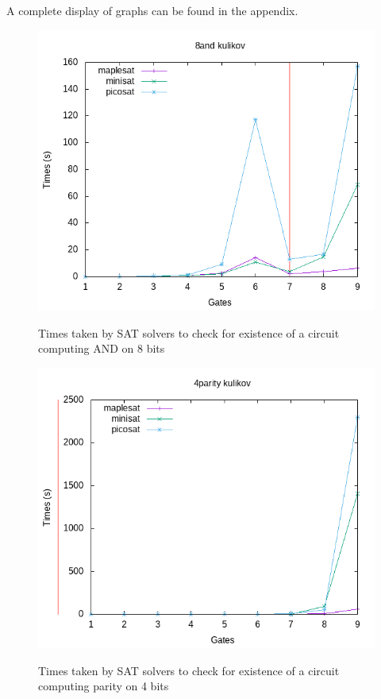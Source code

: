 \documentclass{article}
\begin{document}
A complete display of graphs can be found in the appendix.

\begin{figure}[!ht]
  \includegraphics[width=\textwidth]{images/times/8andkulikov.png}
  \label{fig:8andkulikov}
  \caption{Times taken by SAT solvers to check for existence of a circuit computing AND on 8 bits}
\end{figure}

\begin{figure}[!ht]
  \includegraphics[width=\textwidth]{images/times/4paritykulikov.png}
  \label{fig:4paritykulikov}
  \caption{Times taken by SAT solvers to check for existence of a circuit computing parity on 4 bits}
\end{figure}
\end{document}
